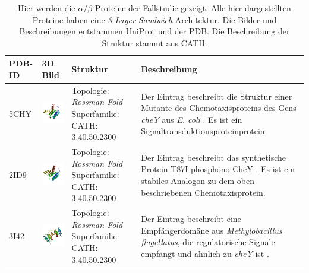 \documentclass{report}
\begin{document}
\begin{table}
\begin{center}
\caption{Hier werden die $\alpha/\beta$-Proteine der Fallstudie gezeigt. Alle hier dargestellten Proteine haben eine \textit{3-Layer-Sandwich}-Architektur. Die Bilder und Beschreibungen entstammen UniProt und der PDB. Die Beschreibung der Struktur stammt aus CATH.}
\begin{tabular}{ | C{9mm} | C{30mm} | C{29mm} | C{38mm} | }
\hline
PDB-ID & 3D Bild & Struktur & Beschreibung \\ \hline
5CHY  & \includegraphics[width=30mm, trim= -10 -5 -5 -10]{5CHY_bio_r_500.jpg} & Topologie: \newline \textit{\textit{Rossman Fold}} \newline Superfamilie: CATH: 3.40.50.2300 & Der Eintrag beschreibt die Struktur einer Mutante des Chemotaxisproteins des Gens \textit{cheY} aus \textit{E. coli} \cite{5chy}. Es ist ein Signaltransduktionsproteinprotein. \\ \hline
2ID9  & \includegraphics[width=30mm, trim= -10 -5 -5 -10]{2ID9_bio_r_500.jpg} & Topologie: \newline \textit{\textit{Rossman Fold}} \newline Superfamilie: CATH: 3.40.50.2300  & Der Eintrag beschreibt das synthetische Protein T87I phosphono-CheY \cite{2id9}. Es ist ein stabiles Analogon zu dem oben beschriebenen Chemotaxisprotein. \\ \hline
3I42  & \includegraphics[width=30mm, trim= -10 -5 -5 -10]{3I42_bio_r_500.jpg} & Topologie: \newline \textit{\textit{Rossman Fold}} \newline Superfamilie: CATH: 3.40.50.2300  & Der Eintrag beschreibt eine Empfängerdom\"ane aus \textit{Methylobacillus flagellatus}, die regulatorische Signale empf\"angt und \"ahnlich zu \textit{cheY} ist \cite{3i42}.  \\ \hline

\end{tabular}
\end{center}
\end{table}
\end{document}
